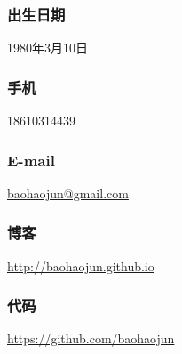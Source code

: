 \documentclass[11pt,dvipdfm,CJKbookmarks]{article}
\begin{document}
\begin{CJK*}{UTF8}{simsun}
\subsubsection{出生日期}
\label{sec-5-0-1}
1980年3月10日

\subsubsection{手机}
\label{sec-5-0-2}
18610314439

\subsubsection{E-mail}
\label{sec-5-0-3}
\href{mailto:baohaojun@gmail.com}{baohaojun@gmail.com}

\subsubsection{博客}
\label{sec-5-0-4}
\url{http://baohaojun.github.io}

\subsubsection{代码}
\label{sec-5-0-5}
\url{https://github.com/baohaojun}


\end{CJK*}
\end{document}
